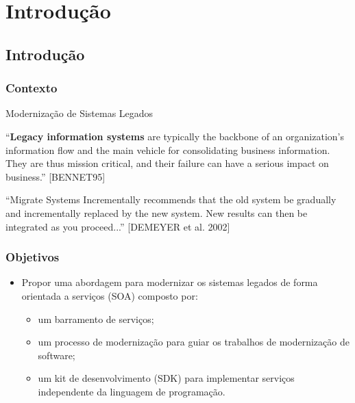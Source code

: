\documentclass{beamer}
\begin{document}
\section{Introdução}


\subsection{Introdução}


\begin{frame}
  \frametitle{Contexto}

  \begin{exampleblock}{Modernização de Sistemas Legados}
  
  “\textbf{Legacy information systems} are typically the
	backbone of an organization’s information flow
	and the main vehicle for consolidating business
	information. They are thus mission critical, and
	their failure can have a serious impact on
	business.” [BENNET95]

	\vspace{0.5cm} 

	“Migrate Systems Incrementally recommends that the old system be
	gradually and incrementally replaced by the new system. New
	results can then be integrated as you proceed...” [DEMEYER et al. 2002]
  \end{exampleblock}

  
\end{frame}







\begin{frame}
  \frametitle{Objetivos}
  
    \begin{itemize}
       \item<1-> Propor uma abordagem para modernizar os sistemas legados de
forma orientada a serviços (SOA) composto por:

    \begin{itemize}
       \item<1->um barramento de serviços;
       \item<1->um processo de modernização para guiar os trabalhos de modernização de software; 
       \item<1->um kit de desenvolvimento (SDK) para implementar serviços independente da
       linguagem de programação.
    \end{itemize}
				
    \end{itemize}
    
\end{frame}
\end{document}
